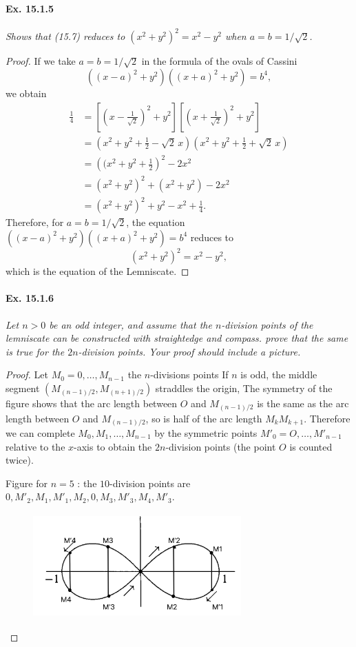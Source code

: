 \documentclass[11pt,a4paper]{article}
\begin{document}
\paragraph{Ex. 15.1.5}{\it  Shows that (15.7) reduces to $(x^2+y^2)^2 = x^2 -y^2$ when $a=b = 1/\sqrt{2}$.
}
\begin{proof}
 If we take $a=b=1/\sqrt{2}$ in the formula of the ovals of Cassini
 $$((x-a)^2 + y^2)((x+a)^2 + y^2) = b^4,$$
 we obtain
 \begin{align*}
 \frac{1}{4} &= \left[ \left(x - \frac{1}{\sqrt{2}} \right)^2 + y^2\right ] \left[ \left(x + \frac{1}{\sqrt{2}} \right)^2 + y^2\right ]  \\
 &=\left( x^2+y^2 +\frac{1}{2}  - \sqrt{2}\, x \right)\left( x^2+y^2 +\frac{1}{2}  + \sqrt{2}\, x \right)\\
 &=\left((x^2 + y^2 + \frac{1}{2}\right)^2 - 2 x^2\\
 &=(x^2+y^2)^2  + (x^2+y^2) - 2 x^2\\
 &= (x^2+y^2)^2 + y^2 -x^2 + \frac{1}{4}.
 \end{align*}
 Therefore, for $a=b =1/\sqrt{2}$, the equation $((x-a)^2 + y^2)((x+a)^2 + y^2) = b^4$ reduces to
 $$(x^2 + y^2)^2 = x^2 - y^2,$$
 which is the equation of the Lemniscate.
\end{proof}
\paragraph{Ex. 15.1.6}{\it Let $n>0$ be an odd integer, and assume that the $n$-division points of the lemniscate can be constructed with straightedge and compass. prove that the same is true for the $2n$-division points. Your proof should include a picture.
}

\begin{proof} Let $M_0=0, \ldots,M_{n-1}$ the $n$-divisions points
If $n$ is odd, the middle segment $(M_{(n-1)/2}, M_{(n+1)/2})$ straddles the origin, The symmetry of the figure shows that the arc length between $O$ and $M_{(n-1)/2}$ is the same as the arc length between $O$ and $M_{(n-1)/2}$, so is half of the arc length $M_k M_{k+1}$. Therefore we can complete $M_0, M_1, \ldots,M_{n-1}$ by the symmetric points $M'_0 = O,\ldots,M'_{n-1}$ relative to the $x$-axis to obtain the $2n$-division points (the point $O$ is counted twice).

Figure for $n=5$ : the $10$-division points are $0,M'_2,M_1,M'_1,M_2,0,M_3,M'_3,M_4,M'_3$.
\begin{figure}[htbp]
\begin{center}
\includegraphics [width=8cm,height=4cm] {lemniscate.png}
\end{center}
\end{figure}
\end{proof}
\end{document}
